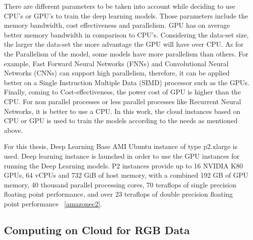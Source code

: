 There are different parameters to be taken into account while deciding to use CPU's or GPU's to train the deep learning models. Those parameters include the memory bandwidth, cost effectiveness and parallelism. GPU has on average better memory bandwidth in comparison to CPU's. Considering the data-set size, the larger the data-set the more advantage the GPU will have over CPU. As for the Parallelism of the model, some models have more parallelism than others. For example, Fast Forward Neural Networks (FNNs) and Convolutional Neural Networks (CNNs) can support high parallelism, therefore, it can be applied better on a Single Instruction Multiple Data (SIMD) processor such as the GPUs. Finally, coming to Cost-effectiveness, the power cost of GPU is higher than the CPU. For non parallel processes or less parallel processes like Recurrent Neural Networks, it is better to use a CPU. In this work, the cloud instances based on CPU or GPU is used to train the models according to the needs as mentioned above.

For this thesis, Deep Learning Base AMI Ubuntu instance of type p2.xlarge is used. Deep learning instance is launched in order to use the GPU instances for running the Deep Learning models. P2 instances provide up to 16 NVIDIA K80 GPUs, 64 vCPUs and 732 GiB of host memory, with a combined 192 GB of GPU memory, 40 thousand parallel processing cores, 70 teraflops of single precision floating point performance, and over 23 teraflops of double precision floating point performance ~\ref{amazonec2}. 


\subsection{Computing on Cloud for RGB Data}
\label{Computing on Cloud for RGB Data}

